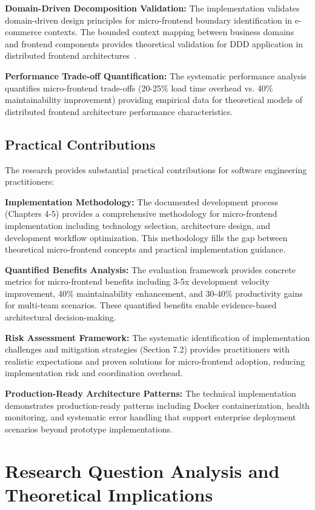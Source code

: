 \documentclass[12pt,a4paper]{report}
\begin{document}
\textbf{Domain-Driven Decomposition Validation:} The implementation validates domain-driven design principles for micro-frontend boundary identification in e-commerce contexts. The bounded context mapping between business domains and frontend components provides theoretical validation for DDD application in distributed frontend architectures~\cite{evans2003domain}.

\textbf{Performance Trade-off Quantification:} The systematic performance analysis quantifies micro-frontend trade-offs (20-25\% load time overhead vs. 40\% maintainability improvement) providing empirical data for theoretical models of distributed frontend architecture performance characteristics.

\subsection{Practical Contributions}

The research provides substantial practical contributions for software engineering practitioners:

\textbf{Implementation Methodology:} The documented development process (Chapters 4-5) provides a comprehensive methodology for micro-frontend implementation including technology selection, architecture design, and development workflow optimization. This methodology fills the gap between theoretical micro-frontend concepts and practical implementation guidance.

\textbf{Quantified Benefits Analysis:} The evaluation framework provides concrete metrics for micro-frontend benefits including 3-5x development velocity improvement, 40\% maintainability enhancement, and 30-40\% productivity gains for multi-team scenarios. These quantified benefits enable evidence-based architectural decision-making.

\textbf{Risk Assessment Framework:} The systematic identification of implementation challenges and mitigation strategies (Section 7.2) provides practitioners with realistic expectations and proven solutions for micro-frontend adoption, reducing implementation risk and coordination overhead.

\textbf{Production-Ready Architecture Patterns:} The technical implementation demonstrates production-ready patterns including Docker containerization, health monitoring, and systematic error handling that support enterprise deployment scenarios beyond prototype implementations.

\section{Research Question Analysis and Theoretical Implications}
\end{document}
